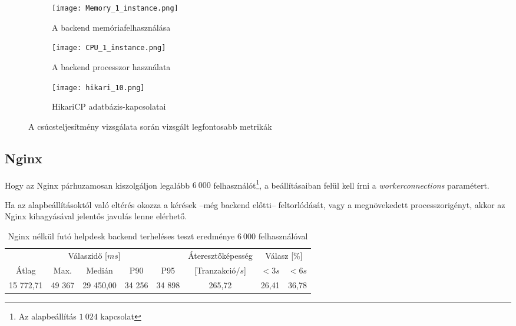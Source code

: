 \begin{figure}[hbt]
	\begin{subfigure}{.95\textwidth}
		\centering
		\texttt{[image: Memory\_1\_instance.png]}  
		\caption{A backend memóriafelhasználása}
		\label{fig:memory_1_instance}

	\end{subfigure}
	\quad

	\begin{subfigure}{.6\textwidth}
		\centering
		\texttt{[image: CPU\_1\_instance.png]}  
		\caption{A backend processzor használata}
		\label{fig:cpu_1_instance}
	\end{subfigure}

	\quad
	\begin{subfigure}{.8\textwidth}
		\centering
		\texttt{[image: hikari\_10.png]}  
		\caption{HikariCP adatbázis-kapcsolatai}
		\label{fig:10_hikari}
	\end{subfigure}
	
	\caption{A csúcsteljesítmény vizsgálata során vizsgált legfontosabb metrikák}
	\label{fig:peak_metrics}
\end{figure}

\pagebreak

\subsection{Nginx}
Hogy az Nginx párhuzamosan kiszolgáljon legalább $6~000$ felhasználót\footnote{Az alapbeállítás $1~024$ kapcsolat}, a beállításaiban felül kell írni a \mbox{\textit{worker\textunderscore connections}} paramétert.

Ha az alapbeállításoktól való eltérés okozza a kérések --még backend előtti-- feltorlódását, vagy a megnövekedett processzorigényt, akkor az Nginx kihagyásával jelentős javulás lenne elérhető.

\bigskip
\begin{table}[hbt]
	
	\begin{tabular}{ccccc|c|cc}
		\multicolumn{5}{c|}{Válaszidő [$ms$]}  & Áteresztőképesség & \multicolumn{2}{c}{Válasz [\%]}	\\
		Átlag & Max. & Medián & P90 & P95 &	[Tranzakció$/s$] & $<3s$& $<6s$ \\
		\hline 
		15 772,71 &  49 367 & 29 450,00 & 34 256 & 34 898 & 265,72 & 26,41 & 36,78 \\
	\end{tabular} 
	
	\caption{Nginx nélkül futó helpdesk backend terheléses teszt eredménye $6~000$ felhasználóval}
	\label{tabl:without_nginx}
\end{table}

